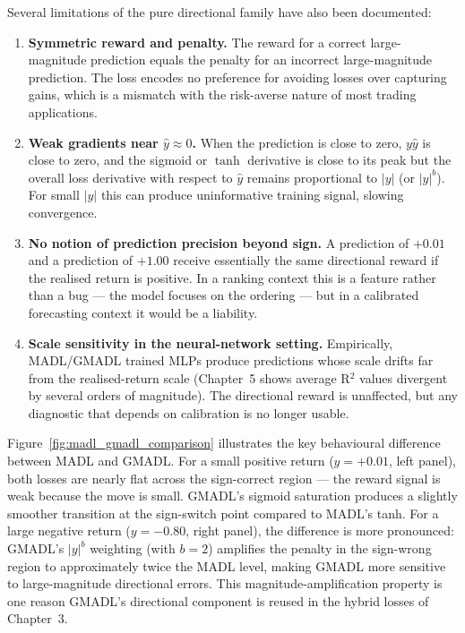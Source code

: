 Several limitations of the pure directional family have also been documented:

\begin{enumerate}
 \item \textbf{Symmetric reward and penalty.} The reward for a correct large-magnitude prediction equals the penalty for an incorrect large-magnitude prediction. The loss encodes no preference for avoiding losses over capturing gains, which is a mismatch with the risk-averse nature of most trading applications.
 \item \textbf{Weak gradients near $\hat{y} \approx 0$.} When the prediction is close to zero, $y \hat{y}$ is close to zero, and the sigmoid or $\tanh$ derivative is close to its peak but the overall loss derivative with respect to $\hat{y}$ remains proportional to $|y|$ (or $|y|^b$). For small $|y|$ this can produce uninformative training signal, slowing convergence.
 \item \textbf{No notion of prediction precision beyond sign.} A prediction of $+0.01$ and a prediction of $+1.00$ receive essentially the same directional reward if the realised return is positive. In a ranking context this is a feature rather than a bug --- the model focuses on the ordering --- but in a calibrated forecasting context it would be a liability.
 \item \textbf{Scale sensitivity in the neural-network setting.} Empirically, MADL/GMADL trained MLPs produce predictions whose scale drifts far from the realised-return scale (Chapter~5 shows average R$^{2}$ values divergent by several orders of magnitude). The directional reward is unaffected, but any diagnostic that depends on calibration is no longer usable.
\end{enumerate}

Figure~\ref{fig:madl_gmadl_comparison} illustrates the key behavioural difference between MADL and GMADL. For a small positive return ($y = +0.01$, left panel), both losses are nearly flat across the sign-correct region --- the reward signal is weak because the move is small. GMADL's sigmoid saturation produces a slightly smoother transition at the sign-switch point compared to MADL's tanh. For a large negative return ($y = -0.80$, right panel), the difference is more pronounced: GMADL's $|y|^b$ weighting (with $b=2$) amplifies the penalty in the sign-wrong region to approximately twice the MADL level, making GMADL more sensitive to large-magnitude directional errors. This magnitude-amplification property is one reason GMADL's directional component is reused in the hybrid losses of Chapter~3.

